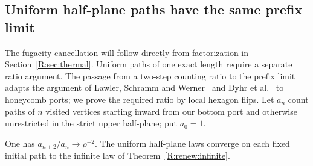 \subsection{Uniform half-plane paths have the same prefix limit}
The fugacity cancellation will follow directly from factorization in Section~\ref{R:sec:thermal}. Uniform paths of one exact length require a separate ratio argument. The passage from a two-step counting ratio to the prefix limit adapts the argument of Lawler, Schramm and Werner~\cite[Appendix]{LSW2004} and Dyhr et al.~\cite[Section~2.3, Proposition~2.9]{Dyhr2011} to honeycomb ports; we prove the required ratio by local hexagon flips. Let $a_n$ count paths of $n$ visited vertices starting inward from our bottom port and otherwise unrestricted in the strict upper half-plane; put $a_0=1$.
\begin{theorem}\label{R:renew:uniform}
One has $a_{n+2}/a_n\to\rho^{-2}$. The uniform half-plane laws converge on each fixed initial path to the infinite law of Theorem~\ref{R:renew:infinite}.
\end{theorem}
